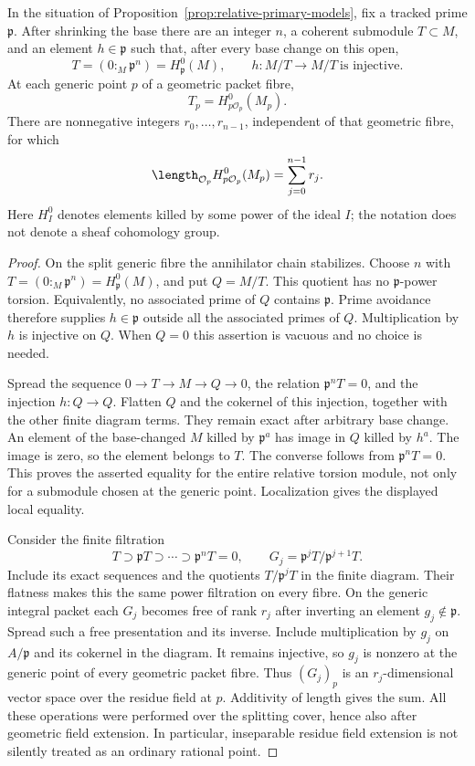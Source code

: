 \begin{proposition}
\label{prop:no-new-packet-torsion}
In the situation of Proposition~\ref{prop:relative-primary-models}, fix
a tracked prime \(\mathfrak p\).  After shrinking the base there are
an integer \(n\), a coherent submodule \(T\subset M\), and an element
\(h\in\mathfrak p\) such that, after every base change on this open,
\[
 T=(0:_M\mathfrak p^n)=H^0_{\mathfrak p}(M),
 \qquad h:M/T\longrightarrow M/T\ \text{is injective}.
\]
At each generic point \(p\) of a geometric packet fibre,
\[
 T_p=H^0_{p\mathcal O_p}(M_p).
\]
There are nonnegative integers \(r_0,\ldots,r_{n-1}\), independent
of that geometric fibre, for which
\[
 \length_{\mathcal O_p}H^0_{p\mathcal O_p}(M_p)
 =\sum_{j=0}^{n-1}r_j.
\]
Here \(H^0_I\) denotes elements killed by some power of the ideal
\(I\); the notation does not denote a sheaf cohomology group.
\end{proposition}
\begin{proof}
On the split generic fibre the annihilator chain stabilizes.  Choose
\(n\) with \(T=(0:_M\mathfrak p^n)=H^0_{\mathfrak p}(M)\), and put
\(Q=M/T\).  This quotient has no \(\mathfrak p\)-power torsion.
Equivalently, no associated prime of \(Q\) contains
\(\mathfrak p\).  Prime avoidance therefore supplies
\(h\in\mathfrak p\) outside all the associated primes of \(Q\).
Multiplication by \(h\) is injective on \(Q\).  When \(Q=0\) this
assertion is vacuous and no choice is needed.

Spread the sequence \(0\to T\to M\to Q\to0\), the relation
\(\mathfrak p^nT=0\), and the injection \(h:Q\to Q\).  Flatten
\(Q\) and the cokernel of this injection, together with the other
finite diagram terms.  They remain exact after arbitrary base change.
An element of the base-changed \(M\) killed by \(\mathfrak p^a\)
has image in \(Q\) killed by \(h^a\).  The image is zero, so the
element belongs to \(T\).  The converse follows from
\(\mathfrak p^nT=0\).  This proves the asserted equality for the
entire relative torsion module, not only for a submodule chosen at the
generic point.  Localization gives the displayed local equality.

Consider the finite filtration
\[
 T\supset\mathfrak pT\supset\cdots\supset\mathfrak p^nT=0,
 \qquad G_j=\mathfrak p^jT/\mathfrak p^{j+1}T.
\]
Include its exact sequences and the quotients \(T/\mathfrak p^jT\)
in the finite diagram.  Their flatness makes this the same power
filtration on every fibre.  On the generic integral packet each
\(G_j\) becomes free of rank \(r_j\) after inverting an element
\(g_j\notin\mathfrak p\).  Spread such a free presentation and its
inverse.  Include multiplication by \(g_j\) on \(A/\mathfrak p\)
and its cokernel in the diagram.  It remains injective, so \(g_j\)
is nonzero at the generic point of every geometric packet fibre.
Thus \((G_j)_p\) is an \(r_j\)-dimensional vector space over the
residue field at \(p\).  Additivity of length gives the sum.  All
these operations were performed over the splitting cover, hence also
after geometric field extension.  In particular, inseparable residue
field extension is not silently treated as an ordinary rational point.
\end{proof}

